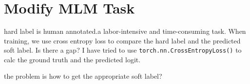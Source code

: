 \documentclass[]{article}
\begin{document}
\section{Modify MLM Task}
hard label is human annotated.a labor-intensive and time-consuming task. When training, we use cross entropy loss to compare the hard label and the predicted soft label. Is there a gap? I have tried to use \verb|torch.nn.CrossEntropyLoss()| to calc the ground truth and the predicted logit. 

the problem is how to get the appropriate soft label?

\section{}
\end{document}
